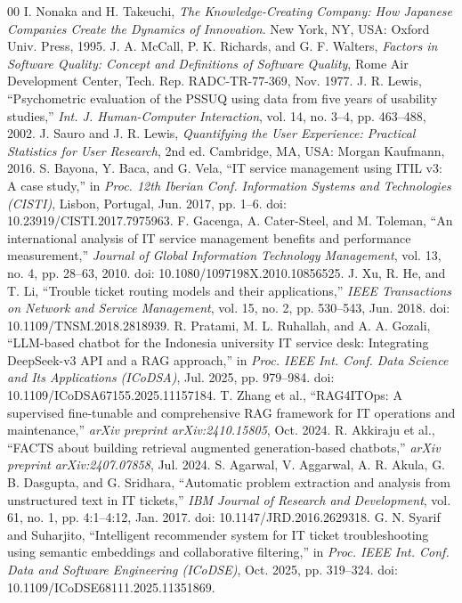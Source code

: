 \documentclass[conference]{IEEEtran}
\begin{document}
\begin{thebibliography}{00}
 I. Nonaka and H. Takeuchi, \textit{The Knowledge-Creating Company: How Japanese Companies Create the Dynamics of Innovation}. New York, NY, USA: Oxford Univ. Press, 1995.
 J. A. McCall, P. K. Richards, and G. F. Walters, \textit{Factors in Software Quality: Concept and Definitions of Software Quality}, Rome Air Development Center, Tech. Rep. RADC-TR-77-369, Nov. 1977.
 J. R. Lewis, ``Psychometric evaluation of the PSSUQ using data from five years of usability studies,'' \textit{Int. J. Human-Computer Interaction}, vol. 14, no. 3--4, pp. 463--488, 2002.
 J. Sauro and J. R. Lewis, \textit{Quantifying the User Experience: Practical Statistics for User Research}, 2nd ed. Cambridge, MA, USA: Morgan Kaufmann, 2016.
 S. Bayona, Y. Baca, and G. Vela, ``IT service management using ITIL v3: A case study,'' in \textit{Proc. 12th Iberian Conf. Information Systems and Technologies (CISTI)}, Lisbon, Portugal, Jun. 2017, pp. 1--6. doi: 10.23919/CISTI.2017.7975963.
 F. Gacenga, A. Cater-Steel, and M. Toleman, ``An international analysis of IT service management benefits and performance measurement,'' \textit{Journal of Global Information Technology Management}, vol. 13, no. 4, pp. 28--63, 2010. doi: 10.1080/1097198X.2010.10856525.
 J. Xu, R. He, and T. Li, ``Trouble ticket routing models and their applications,'' \textit{IEEE Transactions on Network and Service Management}, vol. 15, no. 2, pp. 530--543, Jun. 2018. doi: 10.1109/TNSM.2018.2818939.
 R. Pratami, M. L. Ruhallah, and A. A. Gozali, ``LLM-based chatbot for the Indonesia university IT service desk: Integrating DeepSeek-v3 API and a RAG approach,'' in \textit{Proc. IEEE Int. Conf. Data Science and Its Applications (ICoDSA)}, Jul. 2025, pp. 979--984. doi: 10.1109/ICoDSA67155.2025.11157184.
 T. Zhang et al., ``RAG4ITOps: A supervised fine-tunable and comprehensive RAG framework for IT operations and maintenance,'' \textit{arXiv preprint arXiv:2410.15805}, Oct. 2024.
 R. Akkiraju et al., ``FACTS about building retrieval augmented generation-based chatbots,'' \textit{arXiv preprint arXiv:2407.07858}, Jul. 2024.
 S. Agarwal, V. Aggarwal, A. R. Akula, G. B. Dasgupta, and G. Sridhara, ``Automatic problem extraction and analysis from unstructured text in IT tickets,'' \textit{IBM Journal of Research and Development}, vol. 61, no. 1, pp. 4:1--4:12, Jan. 2017. doi: 10.1147/JRD.2016.2629318.
 G. N. Syarif and Suharjito, ``Intelligent recommender system for IT ticket troubleshooting using semantic embeddings and collaborative filtering,'' in \textit{Proc. IEEE Int. Conf. Data and Software Engineering (ICoDSE)}, Oct. 2025, pp. 319--324. doi: 10.1109/ICoDSE68111.2025.11351869.

\end{thebibliography}
\end{document}
